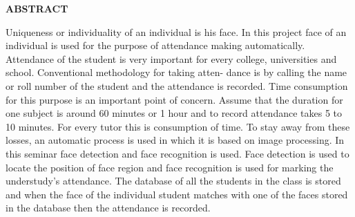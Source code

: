 \documentclass[a4paper, 12pt]{report}
\renewcommand{\baselinestretch}{1.5}
\renewcommand{\headrulewidth}{0.4pt}
\renewcommand{\footrulewidth}{0.4pt}
\renewcommand{\headrulewidth}{0.4pt}
\renewcommand{\footrulewidth}{0.4pt}
\renewcommand{\headrulewidth}{0.4pt}
\renewcommand{\footrulewidth}{0.4pt}
\renewcommand{\headrulewidth}{0.4pt}%
\renewcommand{\footrulewidth}{0.4pt}%
\begin{document}

\begin{titlepage}
\renewcommand{\baselinestretch}{1.5}
{\fontsize{16pt}{16pt}\selectfont\bfseries\center ABSTRACT \par}
Uniqueness or individuality of an individual is his face. In this project face of an individual
is used for the purpose of attendance making automatically. Attendance of the student is very important for every college, universities and school. Conventional methodology for taking atten-
dance is by calling the name or roll number of the student and the attendance is recorded. Time consumption for this purpose is an important point of concern. Assume that the duration for
one subject is around 60 minutes or 1 hour and to record attendance takes 5 to 10 minutes. For every tutor this is consumption of time. To stay away from these losses, an automatic process is
used in which it is based on image processing. In this seminar face detection and face recognition is used. Face detection is used to locate the position of face region and face recognition is used
for marking the understudy’s attendance. The database of all the students in the class is stored and when the face of the individual student matches with one of the faces stored in the database then the attendance is recorded.
\end{titlepage}

\newpage


\renewcommand*\contentsname{INDEX}
\renewcommand\thesection{\arabic{section}}

\tableofcontents
\thispagestyle{empty}
\cleardoublepage
\newpage

\pagestyle{fancy}
\lhead{}
\rfoot{\thepage}

\cfoot{}
\renewcommand{\headrulewidth}{0.4pt}
\renewcommand{\footrulewidth}{0.4pt}
\newpage
\setcounter{page}{1}
\end{document}

